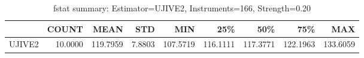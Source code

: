 \begin{table}[ht]
\centering
\caption{fstat summary: Estimator=UJIVE2, Instruments=166, Strength=0.20}
\begin{tabular}{lrrrrrrrr}
\toprule
 & COUNT & MEAN & STD & MIN & 25\% & 50\% & 75\% & MAX \\
\midrule
UJIVE2 & 10.0000 & 119.7959 & 7.8803 & 107.5719 & 116.1111 & 117.3771 & 122.1963 & 133.6059 \\
\bottomrule
\end{tabular}
\end{table}
